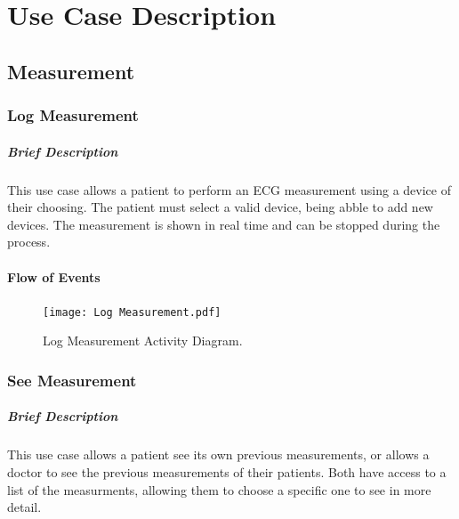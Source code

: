 \documentclass{report}
\begin{document}
\chapter{Use Case Description}
\vspace{-3em}
\section{Measurement}
\subsection{Log Measurement}
\vspace{-1em}
\paragraph{Brief Description}
This use case allows a patient to perform an ECG measurement using a device of their choosing. 
The patient must select a valid device, being abble to add new devices.
The measurement is shown in real time and can be stopped during the process.

\vspace{-1em}
\subsubsection{Flow of Events}
\begin{figure}[ht]
    \centering
    \texttt{[image: Log Measurement.pdf]}
    \caption{Log Measurement Activity Diagram.}
    \label{fig:Log Measure}
\end{figure}

\clearpage
\subsection{See Measurement}

\paragraph{Brief Description}
This use case allows a patient see its own previous measurements, or allows a doctor to see the previous measurements of their patients.
Both have access to a list of the measurments, allowing them to choose a specific one to see in more detail.
\end{document}
